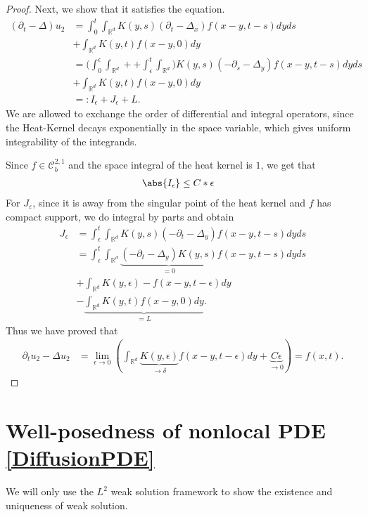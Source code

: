 \begin{proof}
  Next, we show that it satisfies the equation. 
  \begin{align*}
    (\partial_t - \Delta )u_{2}  &= \int_0^{t} \int_{\mathbb{R}^{d} } K(y,s)(\partial_t - \Delta_x)f(x-y,t-s) dy ds \\
                                 &+ \int_{\mathbb{R}^{d} } K(y,t)f(x-y,0) dy\\
                                 &= \Big( \int_{0}^{\epsilon} \int_{\mathbb{R}^{d} } ++  \int_{\epsilon}^{t} \int_{\mathbb{R}^{d} }\Big)K(y,s) \left( -\partial_s - \Delta_y \right)f(x-y,t-s) dy ds  \\
                                 &+   \int_{\mathbb{R}^{d} } K(y,t)f(x-y,0) dy\\
                                 &=: I_{\epsilon} +  J_{\epsilon} + L
  .\end{align*}
  We are allowed to exchange the order of differential and integral operators, since the Heat-Kernel decays exponentially in the space variable, which gives uniform integrability of the integrands.
  
  Since $f \in  \mathcal{C}_b^{2,1}  $ and the space integral of the heat kernel is $1$, we get that 
  \begin{align*}
    \abs{I_\epsilon} &\le  C*\epsilon
  \end{align*}  
  For $J_\varepsilon$, since it is away from the singular point of the heat kernel and $f$ has compact support, we do integral by parts and obtain
  \begin{align*}
    J_{\epsilon} &= \int_{\epsilon}^{t}  \int_{\mathbb{R}^{d} } K(y,s)(-\partial_t - \Delta_y) f(x-y,t-s)dy ds\\
                 &= \int_{\epsilon}^{t}  \int_{\mathbb{R}^{d} } \underbrace{(-\partial_t - \Delta_y)K(y,s)}_{=0}f(x-y,t-s)dy ds\\ 
                 &+ \int_{\mathbb{R}^{d} }K(y,\epsilon) - f(x-y,t-\epsilon) dy \\
                 &-\underbrace{\int_{\mathbb{R}^{d} } K(y,t) f(x-y,0) dy}_{=L }
  .\end{align*}
Thus we have proved that
\begin{align*}
\partial_t u_{2} - \Delta u_{2} &= \lim_{\epsilon \to 0} \left( \int_{\mathbb{R}^{d} } \underbrace{K(y,\epsilon)}_{\to \delta} f(x-y,t-\epsilon) dy + \underbrace{C\epsilon}_{\to 0} \right)  = f(x,t)
.\end{align*}
\end{proof}


\section{Well-posedness of nonlocal PDE \autoref{DiffusionPDE}}
We will only use the $L^2$ weak solution framework to show the existence and uniqueness of weak solution. 

